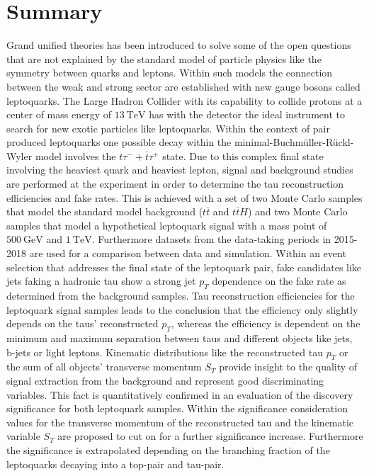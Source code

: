 \chapter*{Summary}
Grand unified theories has been introduced to solve some of the open questions that are not explained by the standard model of particle physics like the symmetry between quarks and leptons. Within such models the connection between the weak and strong sector are established with new gauge bosons called leptoquarks. The Large Hadron Collider with its capability to collide protons at a center of mass energy of $\SI{13}{\tera\electronvolt}$ has with the {\ATLAS} detector the ideal instrument to search for new exotic particles like leptoquarks. Within the context of pair produced leptoquarks one possible decay within the minimal-Buchm\"{u}ller-R\"{u}ckl-Wyler model involves the $t\tau^{-}+\bar{t}\tau^{+}$ state. Due to this complex final state involving the heaviest quark and heaviest lepton, signal and background studies are performed at the {\ATLAS} experiment in order to determine the tau reconstruction efficiencies and fake rates. \newline
This is achieved with a set of two Monte Carlo samples that model the standard model background ($t\bar{t}$ and $t\bar{t}H$) and two Monte Carlo samples that model a hypothetical leptoquark signal with a mass point of $\SI{500}{\giga\electronvolt}$ and $\SI{1}{\tera\electronvolt}$. Furthermore datasets from the {\ATLAS} data-taking periods in 2015-2018 are used for a comparison between data and simulation. Within an event selection that addresses the final state of the leptoquark pair, fake candidates like jets faking a hadronic tau show a strong jet $p_T$ dependence on the fake rate as determined from the background samples. Tau reconstruction efficiencies for the leptoquark signal samples leads to the conclusion that the efficiency only slightly depends on the taus' reconstructed $p_T$, whereas the efficiency is dependent on the minimum and maximum separation between taus and different objects like jets, b-jets or light leptons.\newline     
Kinematic distributions like the reconstructed tau $p_T$ or the sum of all objects' transverse momentum $S_T$ provide insight to the quality of signal extraction from the background and represent good discriminating variables. This fact is quantitatively confirmed in an evaluation of the discovery significance for both leptoquark samples. Within the significance consideration values for the transverse momentum of the reconstructed tau and the kinematic variable $S_T$ are proposed to cut on for a further significance increase. Furthermore the significance is extrapolated depending on the branching fraction of the leptoquarks decaying into a top-pair and tau-pair. 
